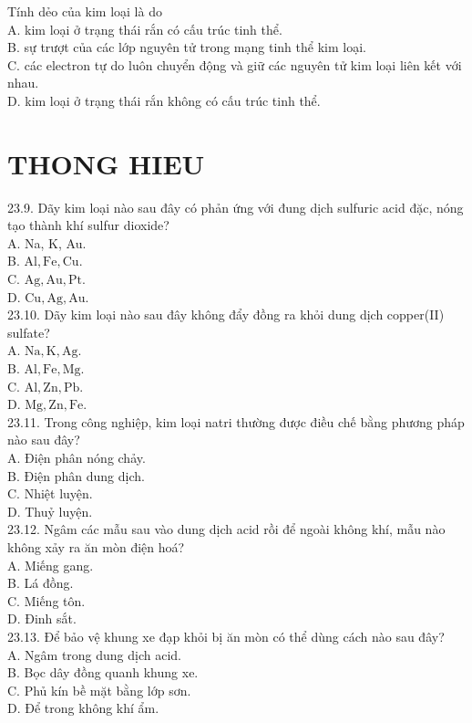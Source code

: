 \documentclass[10pt]{article}
\begin{document}
Tính dẻo của kim loại là do\\
A. kim loại ở trạng thái rắn có cấu trúc tinh thể.\\
B. sự trượt của các lớp nguyên tử trong mạng tinh thể kim loại.\\
C. các electron tự do luôn chuyển động và giữ các nguyên tử kim loại liên kết với nhau.\\
D. kim loại ở trạng thái rắn không có cấu trúc tinh thể.

\section*{THONG HIEU}
23.9. Dãy kim loại nào sau đây có phản ứng với đung dịch sulfuric acid đặc, nóng tạo thành khí sulfur dioxide?\\
A. Na, K, Au.\\
B. $\mathrm{Al}, \mathrm{Fe}, \mathrm{Cu}$.\\
C. $\mathrm{Ag}, \mathrm{Au}, \mathrm{Pt}$.\\
D. $\mathrm{Cu}, \mathrm{Ag}, \mathrm{Au}$.\\
23.10. Dãy kim loại nào sau đây không đẩy đồng ra khỏi dung dịch copper(II) sulfate?\\
A. $\mathrm{Na}, \mathrm{K}, \mathrm{Ag}$.\\
B. $\mathrm{Al}, \mathrm{Fe}, \mathrm{Mg}$.\\
C. $\mathrm{Al}, \mathrm{Zn}, \mathrm{Pb}$.\\
D. $\mathrm{Mg}, \mathrm{Zn}, \mathrm{Fe}$.\\
23.11. Trong công nghiệp, kim loại natri thường được điều chế bằng phương pháp nào sau đây?\\
A. Điện phân nóng chảy.\\
B. Điện phân dung dịch.\\
C. Nhiệt luyện.\\
D. Thuỷ luyện.\\
23.12. Ngâm các mẫu sau vào dung dịch acid rồi để ngoài không khí, mẫu nào không xảy ra ăn mòn điện hoá?\\
A. Miếng gang.\\
B. Lá đồng.\\
C. Miếng tôn.\\
D. Đinh sắt.\\
23.13. Để bảo vệ khung xe đạp khỏi bị ăn mòn có thể dùng cách nào sau đây?\\
A. Ngâm trong dung dịch acid.\\
B. Bọc dây đồng quanh khung xe.\\
C. Phủ kín bề mặt bằng lớp sơn.\\
D. Để trong không khí ẩm.
\end{document}
